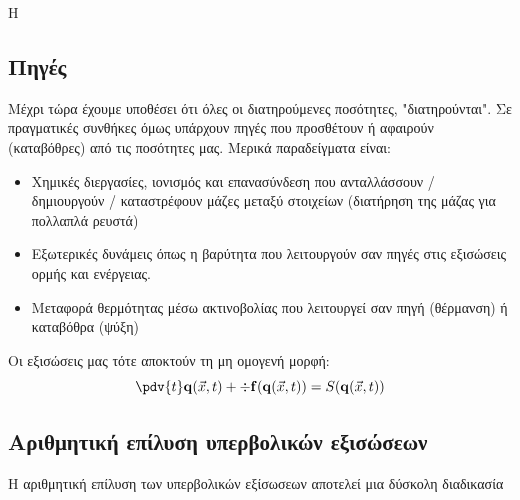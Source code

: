 Η 


\subsection{Πηγές}
Μέχρι τώρα έχουμε υποθέσει ότι όλες οι διατηρούμενες ποσότητες, "διατηρούνται". Σε πραγματικές συνθήκες όμως υπάρχουν πηγές που προσθέτουν ή αφαιρούν (καταβόθρες) από τις ποσότητες μας. Μερικά παραδείγματα είναι:
\begin{itemize}
	\item Χημικές διεργασίες, ιονισμός και επανασύνδεση που ανταλλάσσουν / δημιουργούν / καταστρέφουν μάζες μεταξύ στοιχείων (διατήρηση της μάζας για πολλαπλά ρευστά)
	\item Εξωτερικές δυνάμεις όπως η βαρύτητα που λειτουργούν σαν πηγές στις εξισώσεις ορμής και ενέργειας.
	\item Μεταφορά θερμότητας μέσω ακτινοβολίας που λειτουργεί σαν πηγή (θέρμανση) ή καταβόθρα (ψύξη)
\end{itemize}
Οι εξισώσεις μας τότε αποκτούν τη μη ομογενή μορφή:
\begin{equation}
\pdv{t} \mathbf{q}(\vec{x},t) + \div\mathbf{f}(\mathbf{q}(\vec{x},t)) = S(\mathbf{q}(\vec{x},t))
\end{equation}




\subsection{Αριθμητική επίλυση υπερβολικών εξισώσεων}
Η αριθμητική επίλυση των υπερβολικών εξίσωσεων αποτελεί μια δύσκολη διαδικασία
